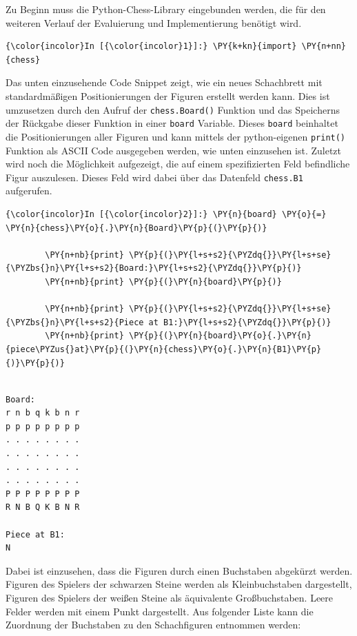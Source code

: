 Zu Beginn muss die Python-Chess-Library eingebunden werden, die für den
weiteren Verlauf der Evaluierung und Implementierung benötigt wird.

    \begin{Verbatim}[commandchars=\\\{\}]
{\color{incolor}In [{\color{incolor}1}]:} \PY{k+kn}{import} \PY{n+nn}{chess}
\end{Verbatim}


    Das unten einzusehende Code Snippet zeigt, wie ein neues Schachbrett mit
standardmäßigen Positionierungen der Figuren erstellt werden kann. Dies
ist umzusetzen durch den Aufruf der \texttt{chess.Board()} Funktion und
das Speicherns der Rückgabe dieser Funktion in einer \texttt{board}
Variable. Dieses \texttt{board} beinhaltet die Positionierungen aller
Figuren und kann mittels der python-eigenen \texttt{print()} Funktion
als ASCII Code ausgegeben werden, wie unten einzusehen ist. Zuletzt wird
noch die Möglichkeit aufgezeigt, die auf einem spezifizierten Feld
befindliche Figur auszulesen. Dieses Feld wird dabei über das Datenfeld
\texttt{chess.B1} aufgerufen.

    \begin{Verbatim}[commandchars=\\\{\}]
{\color{incolor}In [{\color{incolor}2}]:} \PY{n}{board} \PY{o}{=} \PY{n}{chess}\PY{o}{.}\PY{n}{Board}\PY{p}{(}\PY{p}{)}
            
        \PY{n+nb}{print} \PY{p}{(}\PY{l+s+s2}{\PYZdq{}}\PY{l+s+se}{\PYZbs{}n}\PY{l+s+s2}{Board:}\PY{l+s+s2}{\PYZdq{}}\PY{p}{)}
        \PY{n+nb}{print} \PY{p}{(}\PY{n}{board}\PY{p}{)}
        
        \PY{n+nb}{print} \PY{p}{(}\PY{l+s+s2}{\PYZdq{}}\PY{l+s+se}{\PYZbs{}n}\PY{l+s+s2}{Piece at B1:}\PY{l+s+s2}{\PYZdq{}}\PY{p}{)}
        \PY{n+nb}{print} \PY{p}{(}\PY{n}{board}\PY{o}{.}\PY{n}{piece\PYZus{}at}\PY{p}{(}\PY{n}{chess}\PY{o}{.}\PY{n}{B1}\PY{p}{)}\PY{p}{)}
\end{Verbatim}


    \begin{Verbatim}[commandchars=\\\{\}]

Board:
r n b q k b n r
p p p p p p p p
. . . . . . . .
. . . . . . . .
. . . . . . . .
. . . . . . . .
P P P P P P P P
R N B Q K B N R

Piece at B1:
N

    \end{Verbatim}

    Dabei ist einzusehen, dass die Figuren durch einen Buchstaben abgekürzt
werden. Figuren des Spielers der schwarzen Steine werden als Kleinbuchstaben
dargestellt, Figuren des Spielers der weißen Steine als äquivalente
Großbuchstaben. Leere Felder werden mit einem Punkt dargestellt. Aus
folgender Liste kann die Zuordnung der Buchstaben zu den Schachfiguren
entnommen werden:

